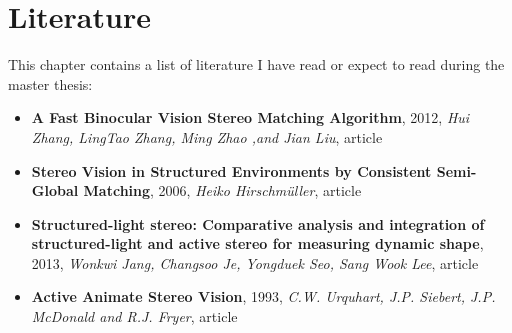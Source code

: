 \chapter{Literature}
This chapter contains a list of literature I have read or expect to read during the master thesis:

\begin{itemize}
\item \textbf{A Fast Binocular Vision Stereo Matching Algorithm}, 2012, \textit{Hui Zhang, LingTao Zhang, Ming Zhao ,and Jian Liu}, article
\item \textbf{Stereo Vision in Structured Environments by Consistent Semi-Global Matching}, 2006, \textit{Heiko Hirschmüller}, article
\item \textbf{Structured-light stereo: Comparative analysis and integration of structured-light and active stereo for measuring dynamic shape}, 2013, \textit{Wonkwi Jang, Changsoo Je, Yongduek Seo, Sang Wook Lee}, article
\item \textbf{Active Animate Stereo Vision}, 1993, \textit{C.W. Urquhart, J.P. Siebert, J.P. McDonald and R.J. Fryer}, article
\end{itemize}